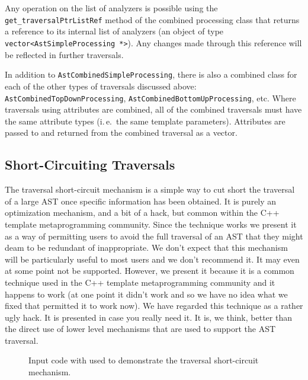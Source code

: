 Any operation on the list of analyzers is possible using the {\tt
get\_traversalPtrListRef} method of the combined processing class that returns
a reference to its internal list of analyzers (an object of type {\tt
vector<AstSimpleProcessing *>}). Any changes made through this reference will
be reflected in further traversals.

In addition to {\tt AstCombinedSimpleProcessing}, there is also a combined
class for each of the other types of traversals discussed above: {\tt
AstCombinedTopDownProcessing}, {\tt AstCombinedBottomUpProcessing}, etc. Where
traversals using attributes are combined, all of the combined traversals must
have the same attribute types (i.\,e.~the same template parameters). Attributes
are passed to and returned from the combined traversal as a vector.

\clearpage
\subsection{Short-Circuiting Traversals}

   The traversal short-circuit mechanism is a simple way to cut short
the traversal of a large AST once specific information has been obtained.
It is purely an optimization mechanism, and a bit of a hack, but common
within the C++ template metaprogramming community. Since the technique works we present it
as a way of permitting users to avoid the full traversal of an AST
that they might deam to be redundant of inappropriate.  We don't
expect that this mechanism will be particularly useful to most users
and we don't recommend it.  It may even at some point not be supported.
However, we present it because it is a common technique used in the C++ 
template metaprogramming community and it happens to work (at one point it didn't work and
so we have no idea what we fixed that permitted it to work now).  We have
regarded this technique as a rather ugly hack.  It is presented in case
you really need it.  It is, we think, better than the direct use of lower
level mechanisms that are used to support the AST traversal.

\begin{figure}[!h]
{\indent
{\mySmallFontSize

\begin{latexonly}
   
\end{latexonly}

\begin{htmlonly}
   
\end{htmlonly}
}
}
\caption{Input code with used to demonstrate the traversal short-circuit mechanism.}
\label{Tutorial:exampleInputCode_ExampleLoopNestingInfoProcessing}
\end{figure}

